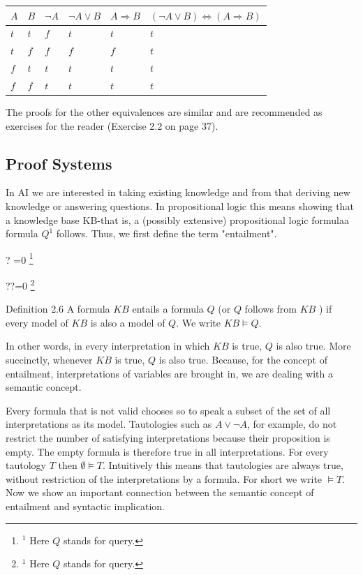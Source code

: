 \documentclass[10pt]{book}
\let\svthefootnote\thefootnote
\newcommand\blfootnotetext[1]{%
  \let\thefootnote\relax\footnote{#1}%
  \addtocounter{footnote}{-1}%
  \let\thefootnote\svthefootnote%
}
\let\svfootnotetext\footnotetext
\renewcommand\footnotetext[2][?]{%
  \if\relax#1\relax%
    \ifnum\value{footnote}=0\blfootnotetext{#2}\else\svfootnotetext{#2}\fi%
  \else%
    \if?#1\ifnum\value{footnote}=0\blfootnotetext{#2}\else\svfootnotetext{#2}\fi%
    \else\svfootnotetext[#1]{#2}\fi%
  \fi
}
\begin{document}
\begin{center}
\begin{tabular}{llllll}
\hline
$A$ & $B$ & $\neg A$ & $\neg A \vee B$ & $A \Rightarrow B$ & $(\neg A \vee B) \Leftrightarrow(A \Rightarrow B)$ \\
\hline
$t$ & $t$ & $f$ & $t$ & $t$ & $t$ \\
\hline
$t$ & $f$ & $f$ & $f$ & $f$ & $t$ \\
\hline
$f$ & $t$ & $t$ & $t$ & $t$ & $t$ \\
\hline
$f$ & $f$ & $t$ & $t$ & $t$ & $t$ \\
\hline
\end{tabular}
\end{center}

The proofs for the other equivalences are similar and are recommended as exercises for the reader (Exercise 2.2 on page 37).

\subsection{Proof Systems}
In AI we are interested in taking existing knowledge and from that deriving new knowledge or answering questions. In propositional logic this means showing that a knowledge base KB-that is, a (possibly extensive) propositional logic formulaa formula $Q^{1}$ follows. Thus, we first define the term "entailment".

Definition 2.6 A formula $K B$ entails a formula $Q$ (or $Q$ follows from $K B$ ) if every model of $K B$ is also a model of $Q$. We write $K B \models Q$.

In other words, in every interpretation in which $K B$ is true, $Q$ is also true. More succinctly, whenever $K B$ is true, $Q$ is also true. Because, for the concept of entailment, interpretations of variables are brought in, we are dealing with a semantic concept.

Every formula that is not valid chooses so to speak a subset of the set of all interpretations as its model. Tautologies such as $A \vee \neg A$, for example, do not restrict the number of satisfying interpretations because their proposition is empty. The empty formula is therefore true in all interpretations. For every tautology $T$ then $\emptyset \models T$. Intuitively this means that tautologies are always true, without restriction of the interpretations by a formula. For short we write $\models T$. Now we show an important connection between the semantic concept of entailment and syntactic implication.
\end{document}
